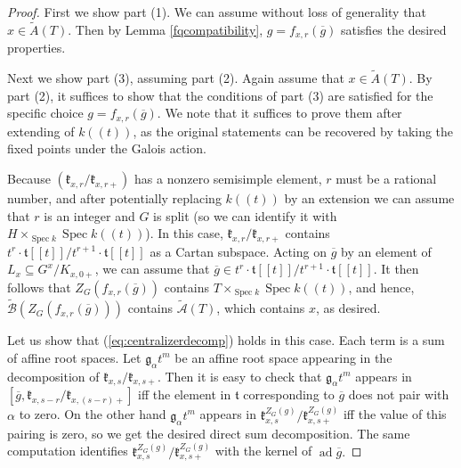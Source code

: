 \documentclass[12pt]{article}
\newcommand{\on}{\operatorname}
\DeclareMathOperator{\Spec}{Spec}
\theoremstyle{remark}
\begin{document}
\begin{proof}
First we show part (1). We can assume without loss of generality that $x\in\widetilde{A}(T).$ Then by Lemma \ref{fqcompatibility}, $g=f_{x,r}(\overline{g})$ satisfies the desired properties.

Next we show part (3), assuming part (2). Again assume that $x\in\widetilde{A}(T).$ By part (2), it suffices to show that the conditions of part (3) are satisfied for the specific choice $g=f_{x,r}(\overline{g})$. We note that it suffices to prove them after extending of $k((t))$, as the original statements can be recovered by taking the fixed points under the Galois action.

Because $(\mathfrak{k}_{x,r}/\mathfrak{k}_{x,r+})$ has a nonzero semisimple element, $r$ must be a rational number, and after potentially replacing $k((t))$ by an extension we can assume that $r$ is an integer and $G$ is split (so we can identify it with $H\times_{\Spec k}\Spec k((t))$). In this case, $\mathfrak{k}_{x,r}/\mathfrak{k}_{x,r+}$ contains $t^r\cdot\mathfrak{t}[[t]]/t^{r+1}\cdot\mathfrak{t}[[t]]$ as a Cartan subspace. Acting on $\overline{g}$ by an element of $L_x\subseteq G^x/K_{x,0+}$, we can assume that $\overline{g}\in t^r\cdot\mathfrak{t}[[t]]/t^{r+1}\cdot\mathfrak{t}[[t]].$ It then follows that $Z_G(f_{x,r}(\overline{g}))$ contains $T\times_{\Spec k}\Spec k((t))$, and hence, $\widetilde{\mathcal{B}}(Z_G(f_{x,r}(\overline{g})))$ contains $\widetilde{\mathcal{A}}(T)$, which contains $x$, as desired.

Let us show that (\ref{eq:centralizerdecomp}) holds in this case. Each term is a sum of affine root spaces. Let $\mathfrak{g}_{\alpha}t^m$ be an affine root space appearing in the decomposition of $\mathfrak{k}_{x,s}/\mathfrak{k}_{x,s+}$. Then it is easy to check that $\mathfrak{g}_{\alpha}t^m$ appears in $[\overline{g},\mathfrak{k}_{x,s-r}/\mathfrak{k}_{x,(s-r)+}]$ iff the element in $\mathfrak{t}$ corresponding to $\overline{g}$ does not pair with $\alpha$ to zero. On the other hand $\mathfrak{g}_{\alpha}t^m$ appears in $\mathfrak{k}^{Z_G(g)}_{x,s}/\mathfrak{k}^{Z_G(g)}_{x,s+}$ iff the value of this pairing is zero, so we get the desired direct sum decomposition. The same computation identifies $\mathfrak{k}^{Z_G(g)}_{x,s}/\mathfrak{k}^{Z_G(g)}_{x,s+}$ with the kernel of $\on{ad}\overline{g}.$


\end{proof}
\end{document}
